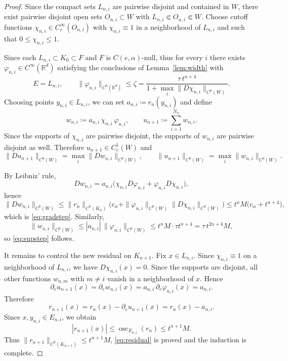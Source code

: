 \documentclass[11pt,a4paper]{article}
\newcommand{\R}{\mathbb{R}}
\newcommand{\osc}{\operatorname{osc}}
\theoremstyle{definition}
\theoremstyle{remark}
\begin{document}
\begin{proof}
Since the compact sets $L_{n,i}$ are pairwise disjoint and contained in $W$, there exist pairwise disjoint open sets $O_{n,i}\subset W$ with $L_{n,i}\Subset O_{n,i}\Subset W$.
Choose cutoff functions $\chi_{n,i}\in C^\infty_c(O_{n,i})$ with $\chi_{n,i}\equiv 1$ in a neighborhood of $L_{n,i}$ and such that $0\le \chi_{n,i}\le 1$.

Since each $L_{n,i}\subset K_0\subset F$ and $F$ is $C(e,\alpha)$-null,
thus for every $i$ there exists $\varphi_{n,i}\in C^\infty(\R^d)$ satisfying the conclusions of Lemma~\ref{lem:width} with
$$
E=L_{n,i},
\qquad
\|\varphi_{n,i}\|_{C^0(\mathbb{R}^d)}
\leq
\zeta
=\dfrac{\tau\,t^{n+4}}{1+\max_i \|D\chi_{n,i}\|_{C^0(W)}} .
$$
Choosing points $y_{n,i}\in L_{n,i}$, we can set $a_{n,i}\coloneqq r_n(y_{n,i})$ and define
$$
w_{n,i}\coloneqq a_{n,i}\,\chi_{n,i}\,\varphi_{n,i},
\qquad
u_{n+1}\coloneqq \sum_{i=1}^{N_n}w_{n,i}.
$$
Since the supports of $\chi_{n,i}$ are pairwise disjoint, the supports of $w_{n,i}$ are pairwise disjoint as well.
Therefore $u_{n+1}\in C^1_c(W)$ and
$$
\|Du_{n+1}\|_{C^0(W)} = \max_i \|Dw_{n,i}\|_{C^0(W)},
\qquad
\|u_{n+1}\|_{C^0(W)} = \max_i \|w_{n,i}\|_{C^0(W)}.
$$

By Leibniz' rule,
$$
Dw_{n,i}=a_{n,i}\bigl(\chi_{n,i}D\varphi_{n,i}+\varphi_{n,i}D\chi_{n,i}\bigr),
$$
hence
$$
\|Dw_{n,i}\|_{C^0(W)}
\le \|r_n\|_{C^0(K_n)}\bigl(c_\alpha+\|\varphi_{n,i}\|_{C^0(W)} \|D\chi_{n,i}\|_{C^0(W)}\bigr)
\le t^{n}M\bigl(c_\alpha+t^{n+4}\bigr),
$$
which is \eqref{eq:gradstep}.
Similarly,
$$
\|w_{n,i}\|_{C^0(W)}
\le |a_{n,i}|\,\|\varphi_{n,i}\|_{C^0(W)}
\le t^{n}M\cdot \tau t^{n+4}
= \tau\,t^{2n+4}M,
$$
so \eqref{eq:supstep} follows.

It remains to control the new residual on $K_{n+1}$.
Fix $x\in L_{n,i}$.
Since $\chi_{n,i}\equiv 1$ on a neighborhood of $L_{n,i}$, we have $D\chi_{n,i}(x)=0$.
Since the supports are disjoint, all other functions $w_{n,m}$ with $m\neq i$ vanish in a neighborhood of $x$.
Hence
$$
\partial_e u_{n+1}(x)=\partial_e w_{n,i}(x)=a_{n,i}\,\partial_e\varphi_{n,i}(x)=a_{n,i}.
$$
Therefore
$$
r_{n+1}(x)=r_n(x)-\partial_e u_{n+1}(x)=r_n(x)-a_{n,i}.
$$
Since $x,y_{n,i}\in E_{n,i}$, we obtain
$$
|r_{n+1}(x)|
\le \osc_{E_{n,i}}(r_n)
\le t^{n+1}M.
$$
Thus $\|r_{n+1}\|_{C^0(K_{n+1})}\le t^{n+1}M$, \eqref{eq:residual} is proved and the induction is complete.


\end{proof}
\end{document}
